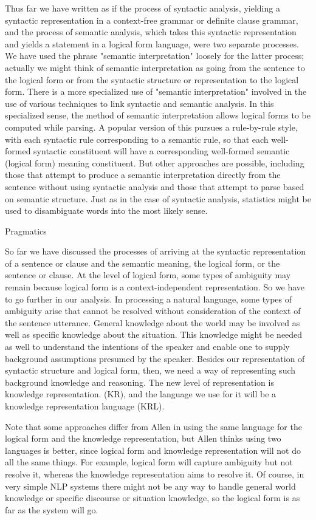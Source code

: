 Thus far we have written as if the process of syntactic analysis, yielding a syntactic representation in a context-free grammar or definite clause grammar, and the process of semantic analysis, which takes this syntactic representation and yields a statement in a logical form language, were two separate processes. We have used the phrase "semantic interpretation" loosely for the latter process; actually we might think of semantic interpretation as going from the sentence to the logical form or from the syntactic structure or representation to the logical form. There is a more specialized use of "semantic interpretation" involved in the use of various techniques to link syntactic and semantic analysis. In this specialized sense, the method of semantic interpretation allows logical forms to be computed while parsing. A popular version of this pursues a rule-by-rule style, with each syntactic rule corresponding to a semantic rule, so that each well-formed syntactic constituent will have a corresponding well-formed semantic (logical form) meaning constituent. But other approaches are possible, including those that attempt to produce a semantic interpretation directly from the sentence without using syntactic analysis and those that attempt to parse based on semantic structure. Just as in the case of syntactic analysis, statistics might be used to disambiguate words into the most likely sense.

Pragmatics

So far we have discussed the processes of arriving at the syntactic representation of a sentence or clause and the semantic meaning, the logical form, or the sentence or clause. At the level of logical form, some types of ambiguity may remain because logical form is a context-independent representation. So we have to go further in our analysis. In processing a natural language, some types of ambiguity arise that cannot be resolved without consideration of the context of the sentence utterance. General knowledge about the world may be involved as well as specific knowledge about the situation. This knowledge might be needed as well to understand the intentions of the speaker and enable one to supply background assumptions presumed by the speaker. Besides our representation of syntactic structure and logical form, then, we need a way of representing such background knowledge and reasoning. The new level of representation is knowledge representation. (KR), and the language we use for it will be a knowledge representation language (KRL).

Note that some approaches differ from Allen in using the same language for the logical form and the knowledge representation, but Allen thinks using two languages is better, since logical form and knowledge representation will not do all the same things. For example, logical form will capture ambiguity but not resolve it, whereas the knowledge representation aims to resolve it. Of course, in very simple NLP systems there might not be any way to handle general world knowledge or specific discourse or situation knowledge, so the logical form is as far as the system will go.

